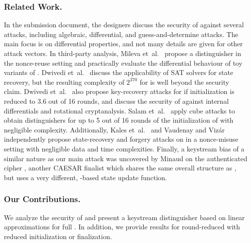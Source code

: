 \subsubsection*{Related Work.}
In the \morus submission document, the designers discuss the security of \morus against
several attacks, including algebraic, differential, and guess-and-determine attacks.
The main focus is on differential properties, and not many details are given for other attack vectors.
In third-party analysis,
Mileva et~al.~\cite{balkancryptsecMilevaDV15} propose a distinguisher in the nonce-reuse setting and practically evaluate the differential behaviour of toy variants of \morus.
Dwivedi et~al.~\cite{cryptoeprint:2016:1053} discuss the applicability of SAT solvers for state recovery, but the resulting complexity of $2^{370}$ for \morus[640] is well beyond the security claim.
Dwivedi et~al.~\cite{secryptDwivediMW17} also propose key-recovery attacks for \morus[1280] if initialization is reduced to 3.6 out of 16 rounds, and discuss the security of \morus against internal differentials and rotational cryptanalysis.
Salam et~al.~\cite{trustcomSalamSBDPW17} apply cube attacks to obtain distinguishers for up to 5 out of 16 rounds of the initialization of \morus[1280] with negligible complexity.
Additionally, 
Kales et~al.~\cite{cryptoeprint:2017:1137} and
Vaudenay and Viz\'{a}r \cite{cryptoeprint:2017:1147}
independently propose state-recovery and forgery attacks on \morus in a nonce-misuse setting with negligible data and time complexities.
Finally, a keystream bias of a similar nature as our main attack was uncovered by Minaud \cite{sacryptMinaud14} on the authenticated cipher  \cite{AEGIS,sacryptWuP13}, another CAESAR finalist which shares the same overall structure as \morus, but uses a very different, -based state update function.

\subsubsection*{Our Contributions.}
We analyze the security of \morus and present a key\-stream distinguisher based on
linear approximations for full \morus[1280].
In addition, we provide results for round-reduced \morus with reduced initialization or finalization.

